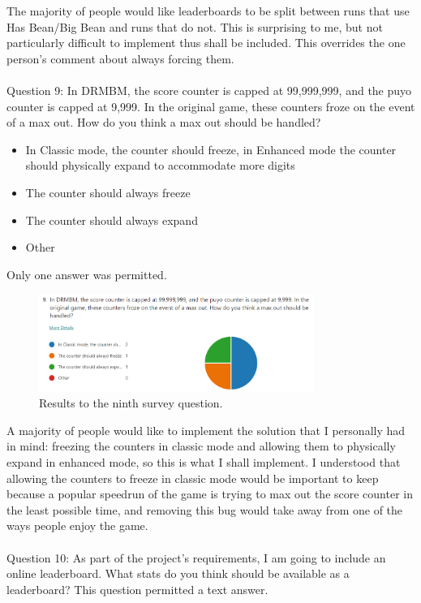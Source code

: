 \documentclass{report}
\begin{document}
The majority of people would like leaderboards to be split between runs that use Has Bean/Big Bean and runs that do not. This is surprising to me, but not particularly difficult to implement thus shall be included. This overrides the one person's comment about always forcing them.
\\\\
Question 9: In DRMBM, the score counter is capped at 99,999,999, and the puyo counter is capped at 9,999. In the original game, these counters froze on the event of a max out. How do you think a max out should be handled?
\begin{itemize}
    \renewcommand\labelitemi{--}
    \item In Classic mode, the counter should freeze, in Enhanced mode the counter should physically expand to accommodate more digits
    \item The counter should always freeze
    \item The counter should always expand
    \item Other
\end{itemize}
Only one answer was permitted.

\begin{figure}[ht]
    \centering
    \includegraphics[width=0.8\textwidth]{survey9.png}
    \caption{\label{fig:survey9}Results to the ninth survey question.}
\end{figure}

A majority of people would like to implement the solution that I personally had in mind: freezing the counters in classic mode and allowing them to physically expand in enhanced mode, so this is what I shall implement. I understood that allowing the counters to freeze in classic mode would be important to keep because a popular speedrun of the game is trying to max out the score counter in the least possible time, and removing this bug would take away from one of the ways people enjoy the game.
\\\\
Question 10: As part of the project's requirements, I am going to include an online leaderboard. What stats do you think should be available as a leaderboard?
This question permitted a text answer.
\end{document}
